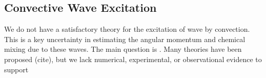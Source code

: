 {\color{purple}
\subsection{Convective Wave Excitation}
}

We do not have a satisfactory theory for the excitation of wave by convection. This is a key uncertainty in estimating the angular momentum and chemical mixing due to these waves. The main question is . Many theories have been proposed (cite), but we lack numerical, experimental, or observational evidence to support  
